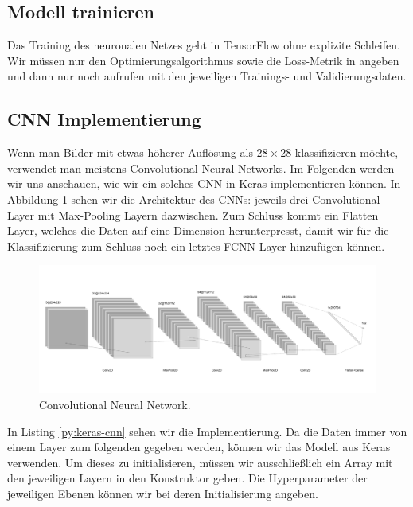 \subsection{Modell trainieren}

Das Training des neuronalen Netzes geht in TensorFlow ohne explizite Schleifen. 
Wir müssen nur den Optimierungsalgorithmus sowie die Loss-Metrik in  
angeben und dann nur noch  aufrufen mit den jeweiligen Trainings- und 
Validierungsdaten. 


\subsection{CNN Implementierung}
Wenn man Bilder mit etwas höherer Auflösung als \(28\times 28\) klassifizieren möchte, verwendet man 
meistens Convolutional Neural Networks. Im Folgenden werden wir uns anschauen, wie wir ein solches CNN in Keras 
implementieren können. In Abbildung \ref{fig:cnn} sehen wir die Architektur des CNNs: jeweils drei Convolutional Layer 
mit Max-Pooling Layern dazwischen. Zum Schluss kommt ein Flatten Layer, welches die Daten auf eine Dimension herunterpresst, 
damit wir für die Klassifizierung zum Schluss noch ein letztes FCNN-Layer hinzufügen können. 

\begin{figure}[htbp]
    \centering
    \includegraphics[width=.9\textwidth]{figures/cnn}
    \caption{Convolutional Neural Network.}
    \label{fig:cnn}
\end{figure}
In Listing \ref{py:keras-cnn} sehen wir die Implementierung. Da die Daten immer von einem Layer zum 
folgenden gegeben werden, können wir das  Modell aus Keras verwenden. 
Um dieses zu initialisieren, müssen wir ausschließlich ein Array mit den jeweiligen Layern in den 
Konstruktor geben. Die Hyperparameter der jeweiligen Ebenen können wir bei deren Initialisierung angeben.

